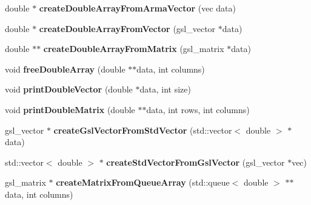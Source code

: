 \begin{DoxyCompactItemize}
\item 
double $\ast$ {\bfseries create\+Double\+Array\+From\+Arma\+Vector} (vec data)\hypertarget{namespacekukadu_a9fd78f70078a0656d2c7c93623cff1b4}{}\label{namespacekukadu_a9fd78f70078a0656d2c7c93623cff1b4}

\item 
double $\ast$ {\bfseries create\+Double\+Array\+From\+Vector} (gsl\+\_\+vector $\ast$data)\hypertarget{namespacekukadu_a5fdba147bef04021392da0a56d126478}{}\label{namespacekukadu_a5fdba147bef04021392da0a56d126478}

\item 
double $\ast$$\ast$ {\bfseries create\+Double\+Array\+From\+Matrix} (gsl\+\_\+matrix $\ast$data)\hypertarget{namespacekukadu_aa1357fb2a6908fa37f7640c5537677ae}{}\label{namespacekukadu_aa1357fb2a6908fa37f7640c5537677ae}

\item 
void {\bfseries free\+Double\+Array} (double $\ast$$\ast$data, int columns)\hypertarget{namespacekukadu_a2355ace0f2bbc7fe4dbd6c6b6b8ffe15}{}\label{namespacekukadu_a2355ace0f2bbc7fe4dbd6c6b6b8ffe15}

\item 
void {\bfseries print\+Double\+Vector} (double $\ast$data, int size)\hypertarget{namespacekukadu_afceb599567dbb0584930fa93bb15c1b3}{}\label{namespacekukadu_afceb599567dbb0584930fa93bb15c1b3}

\item 
void {\bfseries print\+Double\+Matrix} (double $\ast$$\ast$data, int rows, int columns)\hypertarget{namespacekukadu_a381c3ceb132b6c994ca9f588a1f9d346}{}\label{namespacekukadu_a381c3ceb132b6c994ca9f588a1f9d346}

\item 
gsl\+\_\+vector $\ast$ {\bfseries create\+Gsl\+Vector\+From\+Std\+Vector} (std\+::vector$<$ double $>$ $\ast$data)\hypertarget{namespacekukadu_a3166b4ad3fa7342f892e90b01ea725ff}{}\label{namespacekukadu_a3166b4ad3fa7342f892e90b01ea725ff}

\item 
std\+::vector$<$ double $>$ $\ast$ {\bfseries create\+Std\+Vector\+From\+Gsl\+Vector} (gsl\+\_\+vector $\ast$vec)\hypertarget{namespacekukadu_a7e023bd38f66ef8b53bdbf70558d3053}{}\label{namespacekukadu_a7e023bd38f66ef8b53bdbf70558d3053}

\item 
gsl\+\_\+matrix $\ast$ {\bfseries create\+Matrix\+From\+Queue\+Array} (std\+::queue$<$ double $>$ $\ast$$\ast$data, int columns)\hypertarget{namespacekukadu_a0349839959bc23cc4ac3aa4f4fa2bd8d}{}\label{namespacekukadu_a0349839959bc23cc4ac3aa4f4fa2bd8d}


\end{DoxyCompactItemize}
